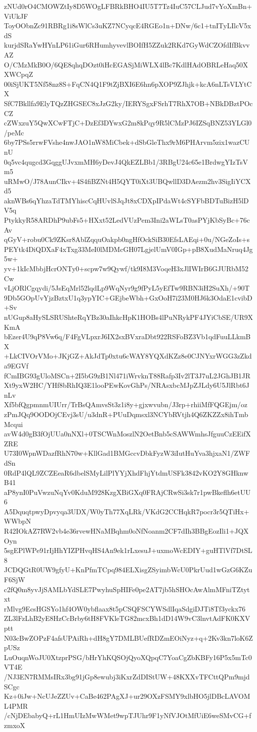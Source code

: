 zNUd0rO4CMOWZtIy8D5WOgLFBRkBHO4IU5T7Tz4IuC57CLJud7vYoXmBn+ViUkJF
ToyOObnZc91RBRg1i8sWlCs3uKZ7NCyqcE4RGEo1n+DNw/6c1+tnITyLIlcV5xdS
kurjdSRaYwHYnLP61iGur6RHumhyvevlBOIfH5ZZuk2RKd7GyWdCZOfdIfBkvvAZ
O/CMzMkB0O/6QE8qhqDOzt0iHcEGASjMiWLX4lBc7KdlHAdOBRLeHaq50XXWCpqZ
00iSjUKT5Nf58nz8S+FqCN4Q1F9tZjBXI6E6hn6pXOP9ZJhjk+kcA6nLTsVLYtCX
SfC7Bkllfa9ElyTQzZHGSEC8xJzG2ky/IERYSgxFSrhT7RhX7OB+NBkDBztPOcCZ
cZWxzuY5QwXCwFTjC+DzEf3DYwxG2m8kPqy9R5lCMzPJ6IZSqBNZ53YLGl0/peMc
6by7PSs5rrwFVshe4nwJAO1nW8MiCbek+dSbGleThx9rM6PHArvm5zix1wazCUnU
0q5vc4qugcd3GqggUJvxmMH6yDevJ4QkEZLBb1/3RBgU24c65e1BrdwgYIzTsVm5
uRMwO/J78AunCIkv+4S4fiBZNt4H5QYT0iXt3UBQwllD3DAezm2hv3SigIiYCXd5
aknWBs6qYhzaTdTMYhiscCqHUvlSJqJt8xCDXpIPdaWt4cSYFbBDTuBizH5lDV5q
PtykkyR58ARDhP9ubFs5+HXxt52LedVUzPem3Ini2aWLsT0asPYjKbSyBc+76cAv
qGyV+robu0Ck9ZKsr8AblZqquOakpb0ngHfOckSiB30EfsLAEqi+0u/NGeZoIs+s
PEYtk4DiQDXaF4xTxg33MeI0lMDMcGH07LgjelUmV0IGp+pB8XudMaNruq4Jg5w+
yv+1kIcMbbjHcrONTy0+scpw7w9Qywf/tk9I8M3VoqeH3xJlIWIrB6GJURbM52Cw
vLjORlCgqydi/5JsEqMrl52lqdLp9WqNyr9g9fPyL5yEfTw9RBN3iH2SuXh/+90T
9Db5GOpUvYjzBztxU1q3ypYIC+GEjbeWbh+GxOoH7i23M0HJ6k3OdaE1cvibD+Sv
nUGup8aHySLSRUShteRqYBz30aIhkcHpK1HOBs4lPuNRykPF4JYiCbSE/UR9XKmA
bEzer4U9qP8Vw6q/F4FgVLpxrJ6IX2sxBVxraDbt922RSFoBZ3Vb1qdFuuLLkmBX
+LkCIVOrVMo+JKjGZ+AkJdTp0xtu6cWAY8YQXdKZz8e0CJNYxrWGG3zZkda9EGVf
fCmIBG93gUloMSCn+2I5bG9zB1Nl471iWrvknT88Rafp3Iv2lT3J7uL2JGhJB1JR
Xt9yxW2HC/YHf8bRhIQ3E1looPEwKovGhPs/NRAsxbcMJpZJLdy6U5JlRbt6JnLv
Xf5bfQgpmnmUIUrr/TrBsQAmvsSt3z1i8y+gjxwvubn/J3rp+rhiiMfFQGEjm/oz
zPmJQq9OODOjCEvj3sU/u3dnR+PUuDqmsxl3NCYbRVtjh4Q6ZKZZx8ihTmbMcqui
avW4d0gB3fOjUUa0nNXl+0TSCWnMoszlN2OetBnb5cSAWWmhsJfguuCzEEifXZRE
U73I0WpnWDazfRhN70w+KllGad1BMGccvDbkFyzW3iIutHuYva3hjxaN1/ZWFdSn
0RdP4lQL9ZCZEeaR6dbelSMyLilPlYYjXhdFhjYtdmUSFk3842vKO2Y8GHknwB41
aP8ynI0PuVwzuNqYv0KduM928KzgXBiGXq0FRAjCRwSi3sk7r1pwBkeflh6etUU6
A5DquqtpwyDpvyqa3UDX/W0yTh77XqLRk/VKdG2CCHqkR7pocr3r5QTiHx+WWbpN
R42IOkAZ7RW2vb4e36rvewHNaMBqhm0oNfNoanm2CF7dIh3BBgEozIli1+JQXOyn
5sgEPlWPe91rIjHhYIZPHvqHS4An9ek1rLxesuJ+uxmoWcEDIY+guHTlVf7DtSL8
JCDQGtR0UW9gfyU+KnPfmTCpq984ELXisgZSyimbWcU0PkrUud1wGzG6KZuF6SjW
c2fQ0m8yvJjSAMLbYdSLE7PwyhuSpHIFe0pe2AT7jb5hSHOcAwAlmMFniTZtytxt
rMlvg9EcsHGSYo1hf4OW0ybflaax8t5pCSQFSCYWSdlIqaSdgiDJTi8Tf3yckx76
ZL3lFzLhB2yE8HzCcBrby6tH8FVKleTG82mcxBh1dD14W9vC3lnvtAdFK0KXVptt
N03cBwZOPzF4afsUPAiRh+dH8gY7DMLBUefRDZmEOiNyz+q+2Kv3kn7loK6ZpUSz
LuOuqnWoJU0XtzprPSG/bHrYhKQSOjQyoXQpqC7YoaCgZbKBFy16P5x5mTc0VT4E
/NJ3EN7RMMsIRx3bg91jGp8ewubj3iKxrZdDIStUW+48KXXvTFCttQPm9mjdSCgc
Kz+0iJw+NcUJeZZUv+CaBe462PAgXJ+ur29OXzFSMY9xlbHO5jlDBcLAVOML4PMR
/cNjDEbabyQ+rL1HmUIzMwWMet9wpTJUhr9F1yNfVJOtMfUiE6weSMvCG+fzmxoX
